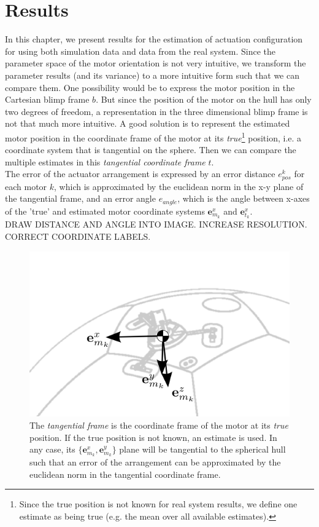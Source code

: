 \chapter{Results}
\label{chap:simulation_results}

In this chapter, we present results for the estimation of actuation configuration for using both simulation data and data from the real system.
Since the parameter space of the motor orientation is not very intuitive, we transform the parameter results (and its variance) to a more intuitive form such that we can compare them.
One possibility would be to express the motor position in the Cartesian blimp frame $b$.
But since the position of the motor on the hull has only two degrees of freedom, a representation in the three dimensional blimp frame is not that much more intuitive.
A good solution is to represent the estimated motor position in the coordinate frame of the motor at its \textit{true}\footnote{
Since the true position is not known for real system results, we define one estimate as being true (e.g. the mean over all available estimates).
}
position, i.e. a coordinate system that is tangential on the sphere.
Then we can compare the multiple estimates in this \textit{tangential coordinate frame} $t$.
\\
The error of the actuator arrangement is expressed by an error distance $e_{pos}^k$ for each motor $k$, which is approximated by the euclidean norm in the x-y plane of the tangential frame,
and an error angle $e_{angle}$, which is the angle between x-axes of the 'true' and estimated motor coordinate systems $\mathbf{e}_{m_k}^x$ and $\mathbf{e}_{t_k}^x$.
\\
DRAW DISTANCE AND ANGLE INTO IMAGE. INCREASE RESOLUTION. CORRECT COORDINATE LABELS.

\begin{figure}[hbtp]
\centering
\includegraphics[scale=1]{images/tangential_frame.png}
\caption{The \textit{tangential frame} is the coordinate frame of the motor at its \textit{true} position. If the true position is not known, an estimate is used. In any case, its $\lbrace \mathbf{e}^x_{m_k} , \mathbf{e}^y_{m_k} \rbrace$ plane will be tangential to the spherical hull such that an error of the arrangement can be approximated by the euclidean norm in the tangential coordinate frame.}
\label{fig:tangential_frame}
\end{figure}

